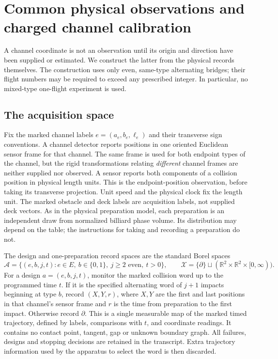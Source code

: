 \section{Common physical observations and charged channel calibration}
\label{sec:v25-common-observables}

A channel coordinate is not an observation until its origin and direction
have been supplied or estimated.  We construct the latter from the physical
records themselves.  The construction uses only even, same-type alternating
bridges; their flight numbers may be required to exceed any prescribed
integer.  In particular, no mixed-type one-flight experiment is used.

\subsection{The acquisition space}

Fix the marked channel labels \(e=(a_e,b_e,\ell_e)\) and their transverse
sign conventions.  A channel detector reports positions in one oriented
Euclidean sensor frame for that channel.  The same frame is used for both
endpoint types of the channel, but the rigid transformations relating
\emph{different} channel frames are neither supplied nor observed.  A sensor
reports both components of a collision position in physical length units.
This is the endpoint-position observation, before taking its transverse
projection.  Unit speed and the physical clock fix the length unit.  The
marked obstacle and deck labels are acquisition labels, not supplied deck
vectors.  As in the physical preparation model, each preparation is an
independent draw from normalized billiard phase volume.  Its distribution
may depend on the table; the instructions for taking and recording a
preparation do not.

The design and one-preparation record spaces are the standard Borel spaces
\begin{equation}\label{eq:v25-design-record-spaces}
 \mathscr A=\{(e,b,j,t):e\in E,\ b\in\{0,1\},\ j\ge2
       \text{ even},\ t>0\},\qquad
 \mathscr X=\{\partial\}\sqcup(\mathbb R^2\times\mathbb R^2
                                      \times[0,\infty)).
\end{equation}
For a design \(a=(e,b,j,t)\), monitor the marked collision word up to the
programmed time \(t\).  If it is the specified alternating word of
\(j+1\) impacts beginning at type \(b\), record
\((X,Y,r)\), where \(X,Y\) are the first and last positions in that
channel's sensor frame and \(r\) is the time from preparation to the first
impact.  Otherwise record \(\partial\).  This is a single measurable map
of the marked timed trajectory, defined by labels, comparisons with \(t\),
and coordinate readings.  It contains no contact point, tangent, gap or
unknown boundary graph.  All failures, designs and stopping decisions are
retained in the transcript.  Extra trajectory information used by the
apparatus to select the word is then discarded.

